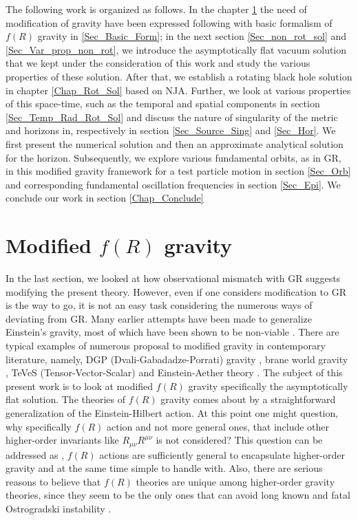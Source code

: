 \documentclass[12pt,a4paper,oneside]{book}
\begin{document}
The following work is organized as follows. In the chapter \ref{Chap_Modif_grav} the need of modification of gravity have been expressed following with basic formalism of $f(R)$ gravity in \ref{Sec_Basic_Form}; in the next section \ref{Sec_non_rot_sol} and \ref{Sec_Var_prop_non_rot}, we introduce the asymptotically flat vacuum solution that we kept under the consideration of this work and study the various properties of these solution. After that, we establish a rotating black hole solution in chapter \ref{Chap_Rot_Sol}  based on NJA. Further, we look at various properties of this space-time, such as the temporal and spatial components in section \ref{Sec_Temp_Rad_Rot_Sol} and discuss the nature of singularity of the metric and horizons in, respectively in section \ref{Sec_Source_Sing} and \ref{Sec_Hor}. We first present the numerical solution and then an approximate analytical solution for the horizon. Subsequently, we explore various fundamental orbits, as in GR, in this modified gravity framework for a test particle motion in section \ref{Sec_Orb} and corresponding fundamental oscillation frequencies in section \ref{Sec_Epi}. We conclude our work in section \ref{Chap_Conclude}
\chapter{Modified $f(R)$ gravity}\label{Chap_Modif_grav}
In the last section, we looked at how observational mismatch with GR suggests modifying the present theory. However, even if one considers modification to GR is the way to go, it is not an easy task considering the numerous ways of deviating from GR. Many earlier attempts have been made to generalize Einstein's gravity, most of which have been shown to be non-viable \cite{Will:2018bme}. There are typical examples of numerous proposal to modified gravity in contemporary literature, namely, DGP (Dvali-Gabadadze-Porrati) gravity \cite{Dvali_2000}, brane world gravity \cite{Maartens_2004}, TeVeS (Tensor-Vector-Scalar) \cite{PhysRevD.70.083509} and Einstein-Aether theory \cite{PhysRevD.64.024028}. The subject of this present work is to look at modified $f(R)$ gravity specifically the asymptotically flat solution. The theories of $f(R)$ gravity comes about by a  straightforward generalization of the Einstein-Hilbert action. At this point one might question, why specifically $f(R)$ action and not more general ones, that include other higher-order invariants like $R_{\mu\nu}R^{\mu\nu}$ is not considered? This question can be addressed as \cite{Sotiriou_2010}, $f(R)$ actions are sufficiently general to encapsulate higher-order gravity and at the same time simple to handle with. Also, there are serious reasons to believe that $f(R)$ theories are unique among higher-order gravity theories, since they seem to be the only ones that can avoid long known and fatal Ostrogradski instability \cite{Woodard}.
\end{document}
